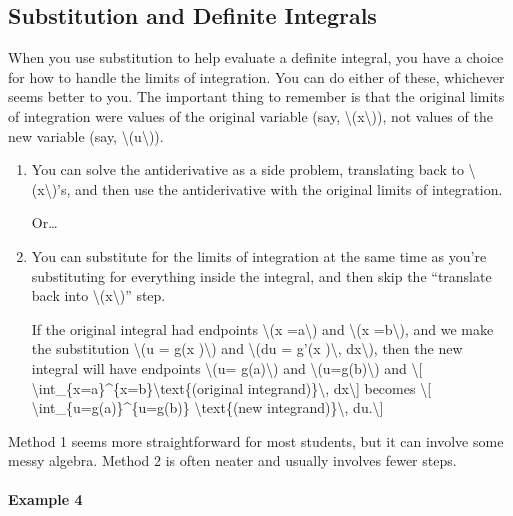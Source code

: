 \hypertarget{substitution-and-definite-integrals}{%
\subsection{Substitution and Definite
Integrals}\label{substitution-and-definite-integrals}}

When you use substitution to help evaluate a definite integral, you have
a choice for how to handle the limits of integration. You can do either
of these, whichever seems better to you. The important thing to remember
is that the original limits of integration were values of the original
variable (say, \textbackslash{}(x\textbackslash{})), not values of the
new variable (say, \textbackslash{}(u\textbackslash{})).

\begin{enumerate}
\item
  You can solve the antiderivative as a side problem, translating back
  to \textbackslash{}(x\textbackslash{})'s, and then use the
  antiderivative with the original limits of integration.

  Or\ldots{}
\item
  You can substitute for the limits of integration at the same time as
  you're substituting for everything inside the integral, and then skip
  the ``translate back into \textbackslash{}(x\textbackslash{})'' step.

  If the original integral had endpoints \textbackslash{}(x
  =a\textbackslash{}) and \textbackslash{}(x =b\textbackslash{}), and we
  make the substitution \textbackslash{}(u = g(x )\textbackslash{}) and
  \textbackslash{}(du = g'(x )\textbackslash{}, dx\textbackslash{}),
  then the new integral will have endpoints \textbackslash{}(u=
  g(a)\textbackslash{}) and \textbackslash{}(u=g(b)\textbackslash{}) and
  \textbackslash{}{[}
  \textbackslash{}int\_\{x=a\}\^{}\{x=b\}\textbackslash{}text\{(original
  integrand)\}\textbackslash{}, dx\textbackslash{}{]} becomes
  \textbackslash{}{[} \textbackslash{}int\_\{u=g(a)\}\^{}\{u=g(b)\}
  \textbackslash{}text\{(new integrand)\}\textbackslash{},
  du.\textbackslash{}{]}
\end{enumerate}

Method 1 seems more straightforward for most students, but it can
involve some messy algebra. Method 2 is often neater and usually
involves fewer steps.

\hypertarget{example-4}{%
\paragraph{Example 4}\label{example-4}}

